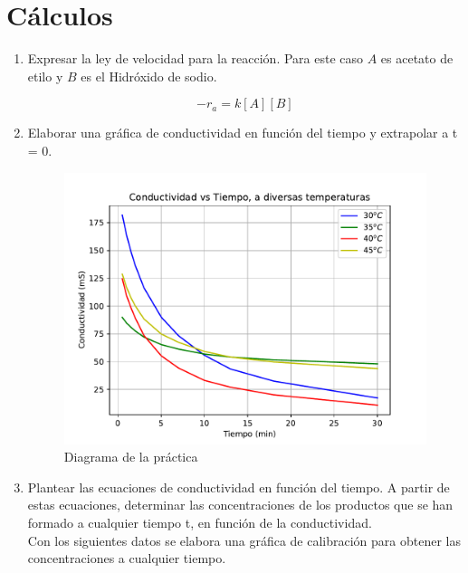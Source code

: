\section{Cálculos}


\begin{enumerate}
        \item Expresar la ley de velocidad para la reacción.
         Para este caso $ A$ es acetato de etilo y $B$ es el Hidróxido de sodio.

                $$ -r_{a}= k[A][B] $$
        \item Elaborar una gráfica de conductividad en función del tiempo y 
        extrapolar a t = 0.

     \begin{figure}[H]
         \centering
         \includegraphics[scale = 0.8]{Figuras/Conductividad_vs_Tiempo.pdf}
         \caption{Diagrama de la pr\'{a}ctica}
      \end{figure}

      \item Plantear las ecuaciones de conductividad en función del tiempo.
       A partir de estas ecuaciones, determinar las concentraciones de los productos 
       que se han formado a cualquier tiempo t, en función de la conductividad.\\
      Con los siguientes  datos se elabora una gráfica de calibración para obtener 
      las concentraciones a cualquier tiempo.




\end{enumerate}

